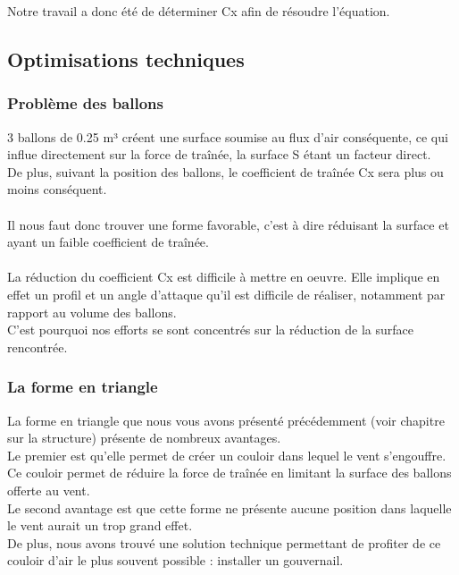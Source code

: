 \documentclass[a4paper,11pt]{article}
\begin{document}
		Notre travail a donc été de déterminer Cx afin de résoudre l'équation.
\subsection{Optimisations techniques}
\subsubsection{Problème des ballons}
	3 ballons de 0.25 m³ créent une surface soumise au flux d'air conséquente, ce qui influe directement sur la force de traînée, la surface S étant un facteur direct.\\
	De plus, suivant la position des ballons, le coefficient de traînée Cx sera plus ou moins conséquent.\\
	\\
	Il nous faut donc trouver une forme favorable, c'est à dire réduisant la surface et ayant un faible coefficient de traînée.\\
	\\
	La réduction du coefficient Cx est difficile à mettre en oeuvre. Elle implique en effet un profil et un angle d'attaque qu'il est difficile de réaliser, notamment par rapport au volume des ballons.\\
	C'est pourquoi nos efforts se sont concentrés sur la réduction de la surface rencontrée.

\subsubsection{La forme en triangle}
	La forme en triangle que nous vous avons présenté précédemment (voir chapitre sur la structure) présente de nombreux avantages.
	\\
	Le premier est qu'elle permet de créer un couloir dans lequel le vent s'engouffre. Ce couloir permet de réduire la force de traînée en limitant la surface des ballons offerte au vent. \\
	Le second avantage est que cette forme ne présente aucune position dans laquelle le vent aurait un trop grand effet.\\
	De plus, nous avons trouvé une solution technique permettant de profiter de ce couloir d'air le plus souvent possible : installer un gouvernail.
\end{document}
